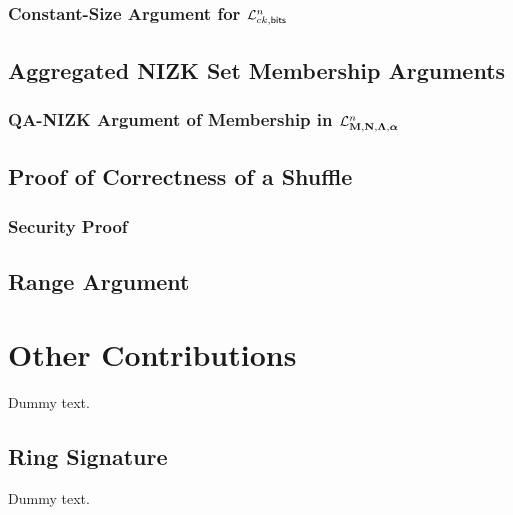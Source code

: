         

        \subsection{Constant-Size Argument for $\mathcal{L}_{ck,\mathsf{bits}}^n$}

            


    \section{Aggregated NIZK Set Membership Arguments}

        

        \subsection{QA-NIZK Argument of Membership in $\mathcal{L}_{\mathbf{{M}},\mathbf{{N}},\mathbf{{\Lambda}},{\boldsymbol \alpha}}^n$} \label{sec:bin-lan-constr}

            

    \section{Proof of Correctness of a Shuffle}

        

        \subsection{Security Proof}

            

    \section{Range Argument}

        

\chapter{Other Contributions}

    Dummy text.

    \section{Ring Signature}

Dummy text.
